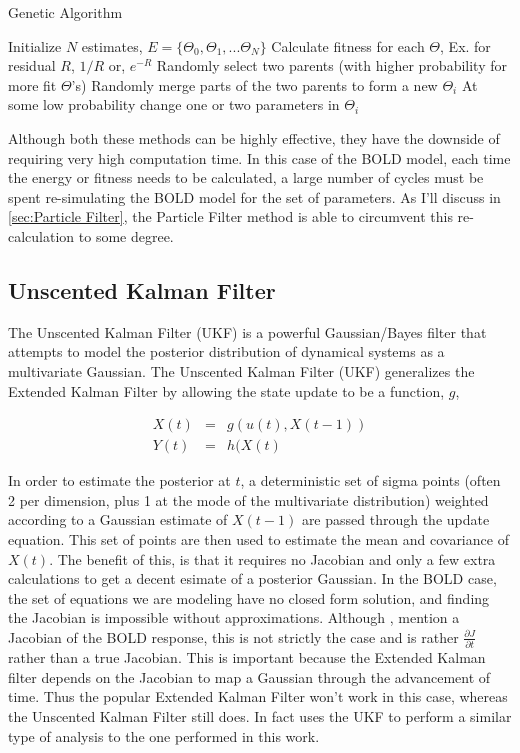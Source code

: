 
\begin{algorithm}
\caption{Genetic Algorithm}
\label{alg:Genetic Algorithm}
\begin{algorithmic}
\STATE Initialize $N$ estimates, $E = \{\Theta_0, \Theta_1, ... \Theta_N\}$
    \STATE Calculate fitness for each $\Theta$, Ex. for residual $R$, $1/R$ or, $e^{-R}$
        \STATE Randomly select two parents (with higher probability for more fit $\Theta$'s)
        \STATE Randomly merge parts of the two parents to form a new $\Theta_i$
        \STATE At some low probability change one or two parameters in $\Theta_i$
    \ENDFOR
\ENDFOR
\end{algorithmic}
\end{algorithm}

Although both these methods can be highly effective, they have the downside of
requiring very high computation time. In this case of the BOLD model,
each time the energy or fitness needs to be calculated, a large number of cycles
must be spent re-simulating the BOLD model for the set of parameters. As I'll
discuss in \autoref{sec:Particle Filter}, the Particle Filter method is able
to circumvent this re-calculation to some degree.

\subsection{Unscented Kalman Filter}
\label{sec:Unscented Kalman Filter}
The Unscented Kalman Filter (UKF) is a powerful Gaussian/Bayes filter that attempts
to model the posterior distribution of dynamical systems as a multivariate
Gaussian. The Unscented Kalman Filter (UKF) generalizes the Extended Kalman
Filter by allowing the state update to be a function, $g$,

\begin{eqnarray}
X(t) &=& g(u(t), X(t-1))\\
Y(t) &=& h(X(t)
\end{eqnarray}

In order to estimate the posterior at $t$, a deterministic set of sigma points 
(often 2 per dimension, plus 1 at the mode of the multivariate distribution)
weighted according to a Gaussian estimate of $X(t-1)$ are passed through
the update equation. This set of points are then used to estimate the 
mean and covariance of $X(t)$. The benefit of this, is that it requires
no Jacobian and only a few extra calculations to get a decent esimate of
a posterior Gaussian. In the BOLD case, the set of equations we are modeling have no 
closed form solution, and finding the Jacobian is impossible without approximations. Although 
\cite{Riera2004}, \cite{Hu2009} mention a Jacobian of the BOLD response, this is
not strictly the case and is rather $\frac{\partial J}{\partial t}$
rather than a true Jacobian.  This is important because the Extended
Kalman filter depends on the Jacobian to map a Gaussian through the 
advancement of time. Thus the popular Extended Kalman Filter won't work
in this case, whereas the Unscented Kalman Filter still does. In fact
\cite{Hu2009} uses the UKF to perform a similar type of analysis to
the one performed in this work. 


